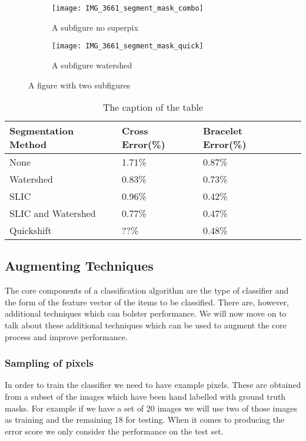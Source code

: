 \documentclass[12pt]{IIBproject}
\begin{document}
\begin{figure}[H]
\centering
\begin{subfigure}{.45\textwidth}
  \centering
  \texttt{[image: IMG\_3661\_segment\_mask\_combo]}
  \caption{A subfigure no superpix}
  \label{fig:sub2}
\end{subfigure}
\begin{subfigure}{.45\textwidth}
  \centering
  \texttt{[image: IMG\_3661\_segment\_mask\_quick]}
  \caption{A subfigure watershed}
  \label{fig:sub1}
\end{subfigure}%


\caption{A figure with two subfigures}
\label{fig:test}
\end{figure}








\begin{table}
\begin{center}
    \begin{tabular}{ | l | l | l | p{5cm} |}
    \hline
    Segmentation Method & Cross Error(\%) & Bracelet Error(\%) \\ \hline
    None & 1.71\% & 0.87\% \\ \hline
    Watershed & 0.83\% & 0.73\% \\ \hline
    SLIC & 0.96\% & 0.42\% \\ \hline
    SLIC and Watershed & 0.77\% & 0.47\% \\ \hline
    Quickshift & ??\% & 0.48\% \\
    \hline
     
    \end{tabular}
    \caption{The caption of the table}\label{table:somename}
\end{center}
\end{table}
\subsection{Augmenting Techniques}
The core components of a classification algorithm are the type of classifier and the form of the feature vector of the items to be classified. There are, however, additional techniques which can bolster performance. We will now move on to talk about these additional techniques which can be used to augment the core process and improve performance.

\subsubsection{Sampling of pixels}
In order to train the classifier we need to have example pixels. These are obtained from a subset of the images which have been hand labelled with ground truth masks. For example if we have a set of 20 images we will use two of those images as training and the remaining 18 for testing. When it comes to producing the error score we only consider the performance on the test set. 
\end{document}
